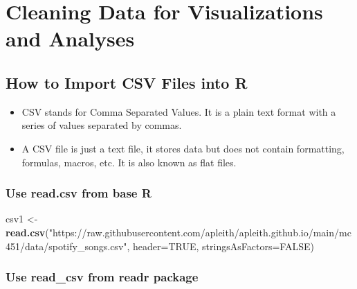 \documentclass[
  b5paper]{book}
\newenvironment{Shaded}{\begin{snugshade}}{\end{snugshade}}
\newcommand{\AttributeTok}[1]{\textcolor[rgb]{0.13,0.29,0.53}{#1}}
\newcommand{\ConstantTok}[1]{\textcolor[rgb]{0.56,0.35,0.01}{#1}}
\newcommand{\FunctionTok}[1]{\textcolor[rgb]{0.13,0.29,0.53}{\textbf{#1}}}
\newcommand{\NormalTok}[1]{#1}
\newcommand{\OtherTok}[1]{\textcolor[rgb]{0.56,0.35,0.01}{#1}}
\newcommand{\StringTok}[1]{\textcolor[rgb]{0.31,0.60,0.02}{#1}}
\providecommand{\tightlist}{%
  \setlength{\itemsep}{0pt}\setlength{\parskip}{0pt}}
\begin{document}
\hypertarget{cleaning-data-for-visualizations-and-analyses}{%
\section{Cleaning Data for Visualizations and Analyses}\label{cleaning-data-for-visualizations-and-analyses}}

\hypertarget{how-to-import-csv-files-into-r}{%
\subsection*{How to Import CSV Files into R}\label{how-to-import-csv-files-into-r}}

\begin{itemize}
\tightlist
\item
  CSV stands for Comma Separated Values. It is a plain text format with a series of values separated by commas.
\item
  A CSV file is just a text file, it stores data but does not contain formatting, formulas, macros, etc. It is also known as flat files.
\end{itemize}

\hypertarget{use-read.csv-from-base-r}{%
\subsubsection*{Use read.csv from base R}\label{use-read.csv-from-base-r}}

\begin{Shaded}
\begin{Highlighting}[]
\NormalTok{csv1 }\OtherTok{\textless{}{-}} \FunctionTok{read.csv}\NormalTok{(}\StringTok{"https://raw.githubusercontent.com/apleith/apleith.github.io/main/mc451/data/spotify\_songs.csv"}\NormalTok{, }\AttributeTok{header=}\ConstantTok{TRUE}\NormalTok{, }\AttributeTok{stringsAsFactors=}\ConstantTok{FALSE}\NormalTok{)}
\end{Highlighting}
\end{Shaded}

\hypertarget{use-read_csv-from-readr-package}{%
\subsubsection*{Use read\_csv from readr package}\label{use-read_csv-from-readr-package}}
\end{document}
